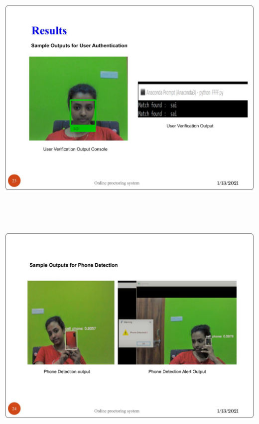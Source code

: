 \documentclass[12pt]{report}
\begin{document}
\includegraphics[width=17cm,height=12cm]{INTERNSHIP SAMPLE PRESENTATION (22)}\\
\includegraphics[width=17cm,height=12cm]{INTERNSHIP SAMPLE PRESENTATION (23)}\\
\end{document}
